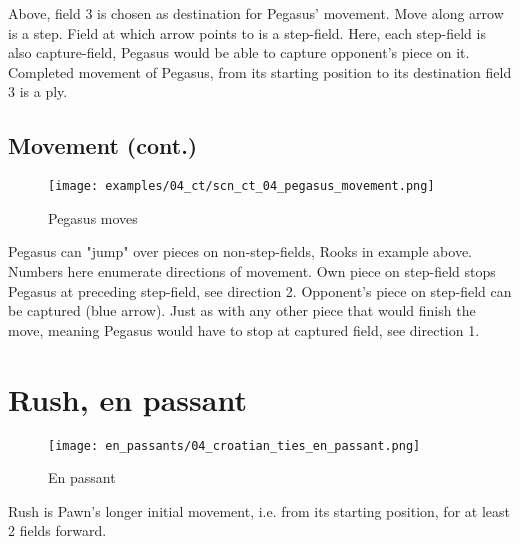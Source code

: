Above, field 3 is chosen as destination for Pegasus' movement. Move along arrow is a step.
Field at which arrow points to is a step-field. Here, each step-field is also capture-field,
Pegasus would be able to capture opponent's piece on it. Completed movement of Pegasus,
from its starting position to its destination field 3 is a ply.

\clearpage %

\subsection*{Movement (cont.)}

\noindent
\begin{figure}[!h]
\vspace{-1.2\baselineskip}
\texttt{[image: examples/04\_ct/scn\_ct\_04\_pegasus\_movement.png]}
\caption{Pegasus moves}
\label{fig:scn_ct_04_pegasus_movement}
\end{figure}

Pegasus can "jump" over pieces on non-step-fields, Rooks in example above. Numbers
here enumerate directions of movement. Own piece on step-field stops Pegasus at
preceding step-field, see direction 2. Opponent's piece on step-field can be captured
(blue arrow). Just as with any other piece that would finish the move, meaning Pegasus
would have to stop at captured field, see direction 1.

\clearpage %

\section*{Rush, en passant}

\noindent
\begin{wrapfigure}{l}{0.4\textwidth}
\centering
\texttt{[image: en\_passants/04\_croatian\_ties\_en\_passant.png]}
\caption{En passant}
\label{fig:04_croatian_ties_en_passant}
\end{wrapfigure}
Rush is Pawn’s longer initial movement, i.e. from its starting position, for at least
2 fields forward.

